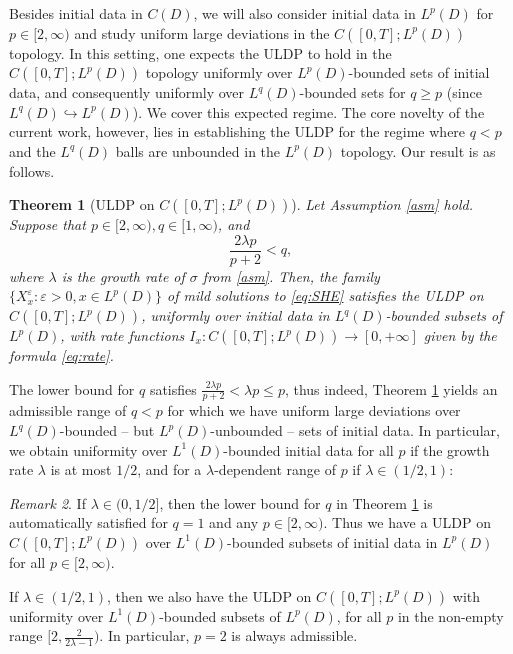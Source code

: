\documentclass{amsart}
\theoremstyle{plain}
\newtheorem{theorem}{Theorem}[section]
\theoremstyle{remark}
\newtheorem{remark}[theorem]{Remark}
\theoremstyle{plain}
\numberwithin{equation}{section}
\newcommand{\col}{\colon}
\newcommand{\eps}{\varepsilon}
\newcommand{\into}{\hookrightarrow}
\begin{document}
Besides initial data in $C(D)$, we will also consider initial data in $L^p(D)$ for $p\in[2,\infty)$ and study uniform large deviations in the  $C([0,T];L^p(D))$ topology.  
In this setting, one expects the ULDP to hold in the $C([0,T];L^p(D))$ topology  uniformly over $L^p(D)$-bounded sets of initial data, and consequently uniformly over $L^q(D)$-bounded sets  for $q\geq p$ (since $L^q(D)\into L^p(D)$). 
We cover this expected regime. The core novelty of the current work, however, lies in establishing the ULDP  for the  regime where $q<p$ and the $L^q(D)$ balls are unbounded in the $L^p(D)$ topology. Our result is as follows. 

\begin{theorem}[{ULDP on $C([0,T];L^p(D))$}]\label{th:Lp}  
Let Assumption \ref{asm} hold. Suppose that $p\in[2,\infty), q\in[1,\infty)$, and  
\begin{equation*} 
\frac{2\lambda p}{p+2}< q,  
\end{equation*}
where $\lambda$ is the growth rate of $\sigma$ from \eqref{asm}. 
Then, the family $\{X_x^{\eps}:\eps>0,x\in L^p(D)\}$ of mild solutions to \eqref{eq:SHE}  satisfies the ULDP on $C([0,T];L^p(D))$, uniformly over initial data in $L^q(D)$-bounded subsets of $L^p(D)$, with rate functions $I_x\col C([0,T];L^p(D))\to [0,+\infty]$ given by the formula \eqref{eq:rate}. 
\end{theorem} 
The lower bound for $q$ satisfies $\frac{2\lambda p}{p+2}<\lambda p\leq p$, thus indeed, Theorem \ref{th:Lp} yields an admissible range of $q<p$  for which we have uniform large deviations over $L^q(D)$-bounded -- but  $L^p(D)$-unbounded -- sets of initial data. In particular, we obtain uniformity over $L^1(D)$-bounded initial data for all $p$ if the growth rate $\lambda$ is at most $1/2$, and for a $\lambda$-dependent range of $p$ if $\lambda\in (1/2,1)$:

\begin{remark}
If $\lambda\in(0,1/2]$, then the lower bound for $q$ in Theorem \ref{th:Lp} is automatically satisfied for $q=1$ and any  $p\in[2,\infty)$.  
Thus we have a ULDP on $C([0,T];L^p(D))$ over $L^1(D)$-bounded subsets of initial data in $L^p(D)$ for all $p\in [2,\infty)$. 

If $\lambda\in(1/2,1)$, then we also have the ULDP on $C([0,T];L^p(D))$ with uniformity over $L^1(D)$-bounded subsets of $L^p(D)$, for all $p$ in the non-empty range $[2,\frac{2}{2\lambda-1})$. In particular,  $p=2$ is always admissible.
\end{remark}
\end{document}
